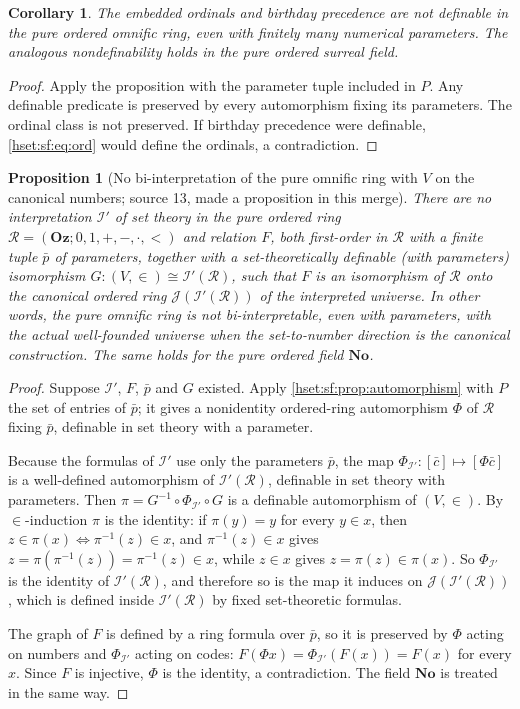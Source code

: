 \documentclass[11pt,letterpaper]{article}
\newtheorem{proposition}[proposition]{Proposition}\aliascntresetthe{proposition}
\newtheorem{corollary}[corollary]{Corollary}\aliascntresetthe{corollary}
\theoremstyle{definition}
\theoremstyle{remark}
\newcommand{\No}{\mathbf{No}}
\newcommand{\I}{\mathcal I}
\newcommand{\J}{\mathcal J}
\newcommand{\Oz}{\mathbf{Oz}}
\begin{document}
\begin{corollary}\label{hset:sf:cor:nondefbirthday}
The embedded ordinals and birthday precedence are not definable in the pure
ordered omnific ring, even with finitely many numerical parameters. The analogous
nondefinability holds in the pure ordered surreal field.
\end{corollary}
\begin{proof}
Apply the proposition with the parameter tuple included in $P$. Any definable
predicate is preserved by every automorphism fixing its parameters. The ordinal
class is not preserved. If birthday precedence were definable,
\eqref{hset:sf:eq:ord} would define the ordinals, a contradiction.
\end{proof}

\begin{proposition}[No bi-interpretation of the pure omnific ring with $V$ on the canonical numbers; source 13, made a proposition in this merge]
\label{hset:sf:prop:purenogo}
There are no interpretation $\I'$ of set theory in the pure ordered ring
$\mathcal R=(\Oz;0,1,+,-,\cdot,<)$ and relation $F$, both first-order in
$\mathcal R$ with a finite tuple $\bar p$ of parameters, together with a
set-theoretically definable (with parameters) isomorphism
$G:(V,\in)\cong\I'(\mathcal R)$, such that $F$ is an isomorphism of $\mathcal R$
onto the canonical ordered ring $\J(\I'(\mathcal R))$ of the interpreted universe.
In other words, the pure omnific ring is not bi-interpretable, even with
parameters, with the actual well-founded universe when the set-to-number direction
is the canonical construction. The same holds for the pure ordered field $\No$.
\end{proposition}
\begin{proof}
Suppose $\I'$, $F$, $\bar p$ and $G$ existed. Apply
\cref{hset:sf:prop:automorphism} with $P$ the set of entries of $\bar p$; it gives a nonidentity ordered-ring
automorphism $\Phi$ of $\mathcal R$ fixing $\bar p$, definable in set theory with a
parameter.

Because the formulas of $\I'$ use only the parameters $\bar p$, the map
$\Phi_{\I'}:[\bar c]\mapsto[\Phi\bar c]$ is a well-defined automorphism of
$\I'(\mathcal R)$, definable in set theory with parameters. Then
$\pi=G^{-1}\circ\Phi_{\I'}\circ G$ is a definable automorphism of $(V,\in)$. By
$\in$-induction $\pi$ is the identity: if $\pi(y)=y$ for every $y\in x$, then
$z\in\pi(x)\iff\pi^{-1}(z)\in x$, and $\pi^{-1}(z)\in x$ gives
$z=\pi(\pi^{-1}(z))=\pi^{-1}(z)\in x$, while $z\in x$ gives $z=\pi(z)\in\pi(x)$. So
$\Phi_{\I'}$ is the identity of $\I'(\mathcal R)$, and therefore so is the map it
induces on $\J(\I'(\mathcal R))$, which is defined inside $\I'(\mathcal R)$ by fixed
set-theoretic formulas.

The graph of $F$ is defined by a ring formula over $\bar p$, so it is preserved by
$\Phi$ acting on numbers and $\Phi_{\I'}$ acting on codes:
$F(\Phi x)=\Phi_{\I'}(F(x))=F(x)$ for every $x$. Since $F$ is injective, $\Phi$ is
the identity, a contradiction. The field $\No$ is treated in the same way.
\end{proof}
\end{document}
